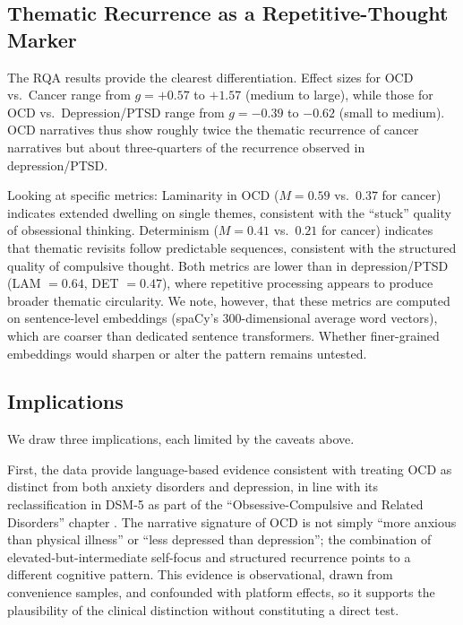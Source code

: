 \documentclass[11pt,a4paper]{article}
\begin{document}
\subsection{Thematic Recurrence as a Repetitive-Thought Marker}

The RQA results provide the clearest differentiation. Effect sizes for OCD vs.\ Cancer range from $g = +0.57$ to $+1.57$ (medium to large), while those for OCD vs.\ Depression/PTSD range from $g = -0.39$ to $-0.62$ (small to medium). OCD narratives thus show roughly twice the thematic recurrence of cancer narratives but about three-quarters of the recurrence observed in depression/PTSD.

Looking at specific metrics: Laminarity in OCD ($M = 0.59$ vs.\ $0.37$ for cancer) indicates extended dwelling on single themes, consistent with the ``stuck'' quality of obsessional thinking. Determinism ($M = 0.41$ vs.\ $0.21$ for cancer) indicates that thematic revisits follow predictable sequences, consistent with the structured quality of compulsive thought. Both metrics are lower than in depression/PTSD (LAM $= 0.64$, DET $= 0.47$), where repetitive processing appears to produce broader thematic circularity. We note, however, that these metrics are computed on sentence-level embeddings (spaCy's 300-dimensional average word vectors), which are coarser than dedicated sentence transformers. Whether finer-grained embeddings would sharpen or alter the pattern remains untested.

\subsection{Implications}

We draw three implications, each limited by the caveats above.

First, the data provide language-based evidence consistent with treating OCD as distinct from both anxiety disorders and depression, in line with its reclassification in DSM-5 as part of the ``Obsessive-Compulsive and Related Disorders'' chapter \citep{apa2013}. The narrative signature of OCD is not simply ``more anxious than physical illness'' or ``less depressed than depression''; the combination of elevated-but-intermediate self-focus and structured recurrence points to a different cognitive pattern. This evidence is observational, drawn from convenience samples, and confounded with platform effects, so it supports the plausibility of the clinical distinction without constituting a direct test.
\end{document}
